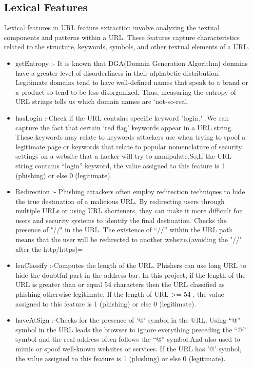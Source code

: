 \subsection{Lexical Features}
\par Lexical features in URL feature extraction involve analyzing the textual components and patterns within a URL. These features capture characteristics related to the structure, keywords, symbols, and other textual elements of a URL.
\begin{itemize}
  \item getEntropy :-{ It is known that DGA(Domain Generation Algorithm) domains have a greater level of disorderliness in their alphabetic distribution. Legitimate domains tend to have well-defined names that speak to a brand or a product so tend to be less disorganized. Thus, measuring the entropy of URL strings tells us which domain names are ‘not-so-real.}
  \item hasLogin :-{Check if the URL contains specific keyword "login," .We can capture the fact that certain ‘red flag’ keywords appear in a URL string. These keywords may relate to keywords attackers use when trying to spoof a legitimate page or keywords that relate to popular nomenclature of security settings on a website that a hacker will try to manipulate.So,If the URL string contains “login” keyword, the value assigned to this feature is 1 (phishing) or else 0 (legitimate).}
  \item Redirection :-{ Phishing attackers often employ redirection techniques to hide the true destination of a malicious URL. By redirecting users through multiple URLs or using URL shorteners, they can make it more difficult for users and security systems to identify the final destination. Checks the presence of "//" in the URL. The existence of “//” within the URL path means that the user will be redirected to another website.(avoiding the "//" after the http/https)=}
  \item lenClassify :-{Computes the length of the URL. Phishers can use long URL to hide the doubtful part in the address bar. In this project, if the length of the URL is greater than or equal 54 characters then the URL classified as phishing otherwise legitimate. If the length of URL >= 54 , the value assigned to this feature is 1 (phishing) or else 0 (legitimate).}
  \item haveAtSign :-{Checks for the presence of '@' symbol in the URL. Using “@” symbol in the URL leads the browser to ignore everything preceding the “@” symbol and the real address often follows the “@” symbol.And also used to mimic or spoof well-known websites or services. If the URL has '@' symbol, the value assigned to this feature is 1 (phishing) or else 0 (legitimate).}

\end{itemize}

